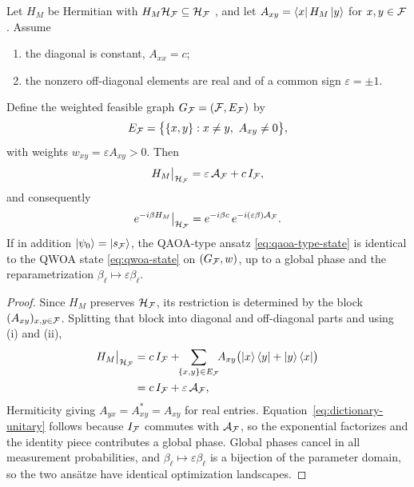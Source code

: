 \begin{lemma}
\label{lem:dictionary}
Let $H_M$ be Hermitian with $H_M\mathcal{H}_{\mathcal{F}}\subseteq\mathcal{H}_{\mathcal{F}}$ ,
and let $A_{xy}=\bra{x}H_M\ket{y}$ for $x,y\in\mathcal{F}$. Assume
\begin{enumerate}
    \item[(i)] the diagonal is constant, $A_{xx}=c$;
    \item[(ii)] the nonzero off-diagonal elements are real and of a common sign
    $\varepsilon=\pm1$.
\end{enumerate}
Define the weighted feasible graph $G_{\mathcal{F}}=(\mathcal{F},E_{\mathcal{F}})$ by
\begin{equation}
    E_{\mathcal{F}}=\bigl\{\{x,y\}:x\neq y,\ A_{xy}\neq 0\bigr\},
    \label{eq:dictionary-graph}
\end{equation}
with weights $w_{xy}=\varepsilon A_{xy}>0$. Then
\begin{equation}
    H_M\big|_{\mathcal{H}_{\mathcal{F}}}
    =
    \varepsilon\,\mathcal{A}_{\mathcal{F}}+c\,I_{\mathcal{F}},
    \label{eq:dictionary-operator}
\end{equation}
and consequently
\begin{equation}
    e^{-i\beta H_M}\big|_{\mathcal{H}_{\mathcal{F}}}
    =
    e^{-i\beta c}\,
    e^{-i(\varepsilon\beta)\mathcal{A}_{\mathcal{F}}} .
    \label{eq:dictionary-unitary}
\end{equation}
If in addition $\ket{\psi_0}=\ket{s_{\mathcal{F}}}$, the QAOA-type ansatz
\eqref{eq:qaoa-type-state} is identical to the QWOA state
\eqref{eq:qwoa-state} on $(G_{\mathcal{F}},w)$, up to a global phase and the
reparametrization $\beta_\ell\mapsto\varepsilon\beta_\ell$.
\end{lemma}

\begin{proof}
Since $H_M$ preserves $\mathcal{H}_{\mathcal{F}}$, its restriction is determined by the
block $(A_{xy})_{x,y\in\mathcal{F}}$. Splitting that block into diagonal and
off-diagonal parts and using (i) and (ii),
\begin{align}
    H_M\big|_{\mathcal{H}_{\mathcal{F}}}
    &=
    c\,I_{\mathcal{F}}
    +
    \!\!\sum_{\{x,y\}\in E_{\mathcal{F}}}\!\!
    A_{xy}\bigl(\ket{x}\bra{y}+\ket{y}\bra{x}\bigr)
    \nonumber\\
    &=
    c\,I_{\mathcal{F}}+\varepsilon\,\mathcal{A}_{\mathcal{F}},
\end{align}
Hermiticity giving $A_{yx}=A_{xy}^{*}=A_{xy}$ for real entries.
Equation~\eqref{eq:dictionary-unitary} follows because $I_{\mathcal{F}}$ commutes with
$\mathcal{A}_{\mathcal{F}}$, so the exponential factorizes and the identity piece
contributes a global phase. Global phases cancel in all measurement
probabilities, and $\beta_\ell\mapsto\varepsilon\beta_\ell$ is a bijection of
the parameter domain, so the two ans\"atze have identical optimization
landscapes.
\end{proof}

